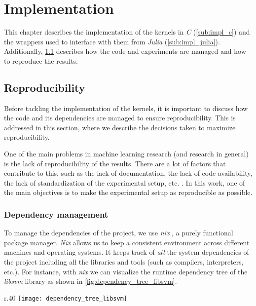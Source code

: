 \chapter{Implementation}
\label{sec:implementation}

This chapter describes the implementation of the kernels in \emph{C} (\cref{sub:impl_c}) and the wrappers
used to interface with them from \emph{Julia} (\cref{sub:impl_julia}). Additionally, \cref{sec:reproducibility}
describes how the code and experiments are managed and how to reproduce the results.

\section{Reproducibility}
\label{sec:reproducibility}

Before tackling the implementation of the kernels, it is important to discuss how the
code and its dependencies are managed to ensure reproducibility. This is addressed in
this section, where we describe the decisions taken to maximize reproducibility.

One of the main problems in machine learning research (and research in general) is the lack of
reproducibility of the results. There are a lot of factors that contribute to this, such as
the lack of documentation, the lack of code availability, the lack of standardization of
the experimental setup, etc. \cite{alstonBeginnerGuideConducting2021}. In this work, one of the main objectives is to make the
experimental setup as reproducible as possible.

\subsection{Dependency management}%
\label{sub:dependency_management}

To manage the dependencies of the project, we use \emph{nix} \cite{NixNixOSReproducible}, a purely
functional package manager. \emph{Nix} allows us to keep a consistent environment across different
machines and operating systems. It keeps track of \emph{all} the system dependencies of the project
including all the libraries and tools (such as compilers, interpreters, etc.). For instance, with
\emph{nix} we can visualize the runtime dependency tree of the \emph{libsvm} library as shown in
\cref{fig:dependency_tree_libsvm}.

\begin{wrapfigure}{r}{.40\textwidth}
    \texttt{[image: dependency\_tree\_libsvm]}
    \caption{\emph{libsvm} dependencies.}
    \label{fig:dependency_tree_libsvm}
\end{wrapfigure}

